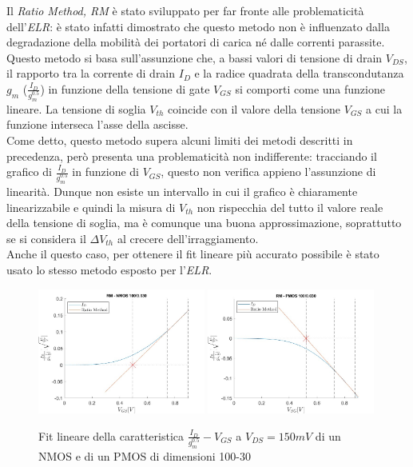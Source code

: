 \documentclass[12pt, letterpaper]{book}
\begin{document}
Il \emph{Ratio Method, RM} è stato sviluppato per far fronte alle problematicità dell'\emph{ELR}: è stato infatti dimostrato che questo metodo non è influenzato dalla degradazione della mobilità dei portatori di carica né dalle correnti parassite. Questo metodo si basa sull'assunzione che, a bassi valori di tensione di drain $V_{DS}$, il rapporto tra la corrente di drain $I_D$ e la radice quadrata della transcondutanza $g_m$ ($\frac{I_D}{g_m^{0.5}}$) in funzione della tensione di gate $V_{GS}$ si comporti come una funzione lineare. La tensione di soglia $V_{th}$ coincide con il valore della tensione $V_{GS}$ a cui la funzione interseca l'asse della ascisse. \\
Come detto, questo metodo supera alcuni limiti dei metodi descritti in precedenza, però presenta una problematicità non indifferente: tracciando il grafico di $\frac{I_D}{g_m^{0.5}}$ in funzione di $V_{GS}$, questo non verifica appieno l'assunzione di linearità. Dunque non esiste un intervallo in cui il grafico è chiaramente linearizzabile e quindi la misura di $V_{th}$ non rispecchia del tutto il valore reale della tensione di soglia, ma è comunque una buona approssimazione, soprattutto se si considera il $\Delta V_{th}$ al crecere dell'irraggiamento.\\
Anche il questo caso, per ottenere il fit lineare più accurato possibile è stato usato lo stesso metodo esposto per l'\emph{ELR}.


\begin{figure}[h!]
  \centering
  \includegraphics[width=0.49\textwidth]{RM-N4-100-30}
  \includegraphics[width=0.49\textwidth]{RM-P1-100-30}
  \caption{Fit lineare della caratteristica $\frac{I_D}{g_m^{0.5}}-V_{GS}$ a $V_{DS}=150mV$ di un NMOS e di un PMOS di dimensioni 100-30}
\end{figure}
\end{document}
